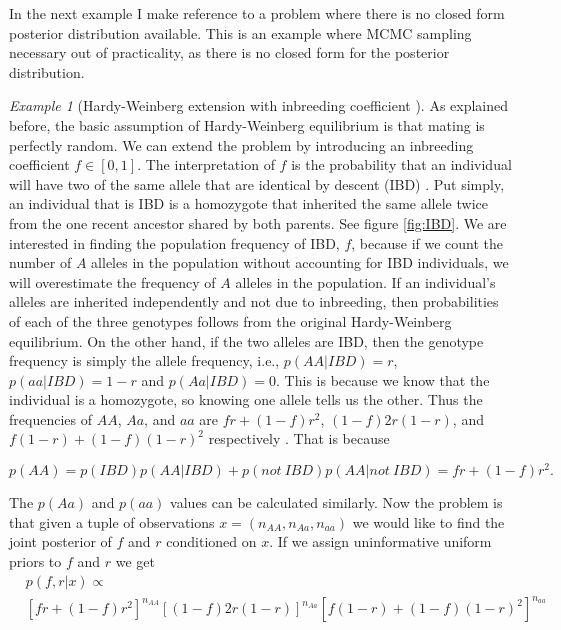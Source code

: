 \documentclass[11pt]{amsart}
\theoremstyle{theorem} %
\theoremstyle{definition}                  %
\theoremstyle{example}                       %
\theoremstyle{remark}                       %
\newtheorem{exmp}[thm]{Example}  %
\numberwithin{equation}{section}
\begin{document}
In the next example I make reference to a problem where there is no closed form posterior distribution available. This is an example where MCMC sampling necessary out of practicality, as there is no closed form for the posterior distribution.

\begin{exmp}[{Hardy-Weinberg extension with inbreeding coefficient \cite{stephens}}]
\label{ex:hwinbreedingmh}
    As explained before, the basic assumption of Hardy-Weinberg equilibrium is that mating is perfectly random. We can extend the problem by introducing an inbreeding coefficient $f\in [0,1]$. The interpretation of $f$ is the probability that an individual will have two of the same allele that are identical by descent (IBD) \cite[p.~64]{gen}. Put simply, an individual that is IBD is a homozygote that inherited the same allele twice from the one recent ancestor shared by both parents. See figure \ref{fig:IBD}. We are interested in finding the population frequency of IBD, $f$, because if we count the number of $A$ alleles in the population without accounting for IBD individuals, we will overestimate the frequency of $A$ alleles in the population. If an individual's alleles are inherited independently and not due to inbreeding, then probabilities of each of the three genotypes follows from the original Hardy-Weinberg equilibrium. On the other hand, if the two alleles are IBD, then the genotype frequency is simply the allele frequency, i.e., $p(AA|IBD)=r$, $p(aa|IBD)=1-r$ and $p(Aa|IBD)=0$. This is because we know that the individual is a homozygote, so knowing one allele tells us the other. Thus the frequencies of $AA$, $Aa$, and $aa$ are $fr+(1-f)r^2$, $(1-f)2r(1-r)$, and $f(1-r)+(1-f)(1-r)^2$ respectively \cite[p.~65]{gen}. That is because
    
    \[p(AA)=p(IBD)p(AA|IBD)+p(not~ IBD)p(AA| not~IBD)=fr+(1-f)r^2.\]
    
    The $p(Aa)$ and $p(aa)$ values can be calculated similarly. Now the problem is that given a tuple of observations $x=(n_{AA},n_{Aa},n_{aa})$ we would like to find the joint posterior of $f$ and $r$ conditioned on $x$. If we assign uninformative uniform priors to $f$ and $r$ we get
    \begin{align*}
        &p(f,r|x)\propto \\ &\left[fr+(1-f)r^2\right]^{n_{AA}}\left[(1-f)2r(1-r)\right]^{n_{Aa}} \left[f(1-r)+(1-f)(1-r)^2\right]^{n_{aa}}
    \end{align*}
    

\end{exmp}
\end{document}
